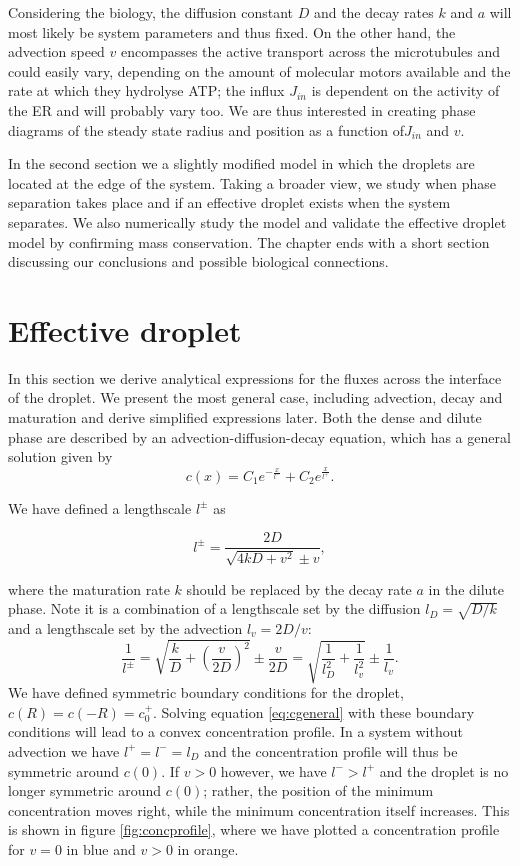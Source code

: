 \documentclass{Dissertate}
\begin{document}
Considering the biology, the diffusion constant \(D\) and the decay
rates \(k\) and \(a\) will most likely be system parameters and thus
fixed. On the other hand, the advection speed \(v\) encompasses the
active transport across the microtubules and could easily vary,
depending on the amount of molecular motors available and the rate at
which they hydrolyse ATP; the influx \(J_{in}\) is dependent on the activity
of the ER and will probably vary too. We are thus interested in
creating phase diagrams of the steady state radius and position as a
function of\(J_{in}\) and \(v\).

In the second section we a slightly modified model in which the droplets are located at the edge of the system. Taking a broader view, we study when phase separation takes place and if an effective droplet exists when the system separates. We also numerically study the model and validate the effective droplet model by confirming mass conservation. The
chapter ends with a short section discussing our conclusions and
possible biological connections.

\hypertarget{effective-droplet-1}{%
\section{Effective droplet}\label{effective-droplet-1}}

In this section we derive analytical expressions for the fluxes across
the interface of the droplet. We present the most general case,
including advection, decay and maturation and derive simplified
expressions later. Both the dense and dilute phase are described by an
advection-diffusion-decay equation, which has a general solution given
by \begin{equation}
c(x) = C_1e^{-\frac{x}{l^-}}+C_2e^{\frac{x}{l^+}}.
\label{eq:cgeneral}\end{equation}

We have defined a lengthscale \(l^\pm\) as

\begin{equation}
l^\pm= \frac{2D}{\sqrt{4kD+v^2}\pm v },
\label{eq:lengthscale}\end{equation}

where the maturation rate \(k\) should be replaced by the decay rate
\(a\) in the dilute phase. Note it is a combination of a lengthscale set
by the diffusion \(l_D=\sqrt{D/k}\) and a lengthscale set by the
advection \(l_v=2D/v\): \[
\frac{1}{l^{\pm}} = \sqrt{\frac{k}{D}+\left(\frac{v}{2D}\right)^2}\pm\frac{v}{2D}=\sqrt{\frac{1}{l_D^2}+\frac{1}{l_v^2}}\pm\frac{1}{l_{v}}.
\] We have defined symmetric boundary conditions for the droplet,
\(c(R)=c(-R)=c_0^+\). Solving equation \ref{eq:cgeneral} with these
boundary conditions will lead to a convex concentration profile. In a system without advection we have \(l^+=l^-=l_D\) and the concentration profile will thus be symmetric around \(c(0)\). If \(v>0\) however, we have \(l^- >l^+\) and
the droplet is no longer symmetric around \(c(0)\); rather, the position
of the minimum concentration moves right, while the minimum
concentration itself increases. This is shown in figure
\ref{fig:concprofile}, where we have plotted a concentration
profile for \(v=0\) in blue and \(v>0\) in orange.
\end{document}
